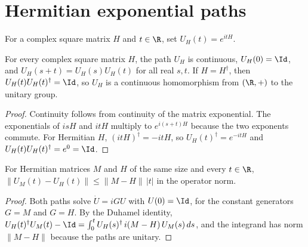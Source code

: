 \section{Hermitian exponential paths}
\label{sec:hermitian_exponential_paths}

\begin{definition}
    \label{def:hermitian_exponential_path}
    \leanok
    For a complex square matrix $H$ and $t\in\R$, set $U_H(t)=e^{itH}$.
\end{definition}

\begin{theorem}
    \label{thm:hermitian_exponential_group}
    \leanok
    For every complex square matrix $H$, the path $U_H$ is continuous,
    $U_H(0)=\Id$, and $U_H(s+t)=U_H(s)U_H(t)$ for all real $s,t$.
    If $H=H^\dagger$, then $U_H(t)U_H(t)^\dagger=\Id$, so $U_H$
    is a continuous homomorphism from $(\R,+)$ to the unitary group.
\end{theorem}
\begin{proof}\leanok
    Continuity follows from continuity of the matrix exponential.
    The exponentials of $isH$ and $itH$ multiply to $e^{i(s+t)H}$
    because the two exponents commute. For Hermitian $H$,
    $(itH)^\dagger=-itH$, so $U_H(t)^\dagger=e^{-itH}$ and
    $U_H(t)U_H(t)^\dagger=e^0=\Id$.
\end{proof}

\begin{theorem}
    \label{thm:hermitian_exponential_path_difference}
    \leanok
    For Hermitian matrices $M$ and $H$ of the same size and every $t\in\R$,
    $\lVert U_M(t)-U_H(t)\rVert\le\lVert M-H\rVert\,|t|$ in the operator norm.
\end{theorem}
\begin{proof}\leanok
    Both paths solve $\dot U=iGU$ with $U(0)=\Id$, for the constant
    generators $G=M$ and $G=H$. By the Duhamel identity,
    $U_H(t)^\dagger U_M(t)-\Id=\int_0^tU_H(s)^\dagger\,i(M-H)\,U_M(s)\,ds$,
    and the integrand has norm $\lVert M-H\rVert$ because the paths are
    unitary.
\end{proof}

